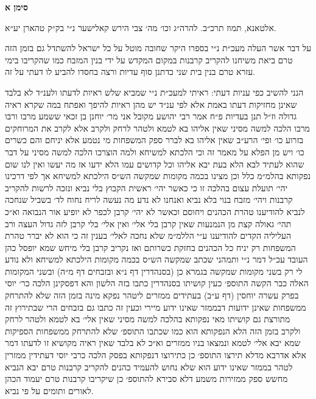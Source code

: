 \documentclass[12pt, openany]{book}
\newcommand{\chapname}{}
\newcommand{\newchap}[1]{
	\addcontentsline{toc}{chapter}{#1}
	\renewcommand{\chapname}{#1}
		\begin{center}
			\textbf{%
\fontsize{16pt}{16pt}\selectfont
				#1}
		\end{center}
}
\begin{document}
\newchap{סימן א}
\begin{multicols}{2}
אלטאנא, תמוז תרכ״ב. להרה״ג וכו׳ מה׳ צבי הירש קאלישער נ״י בק״ק טהארן יע״א.\\\vspace{0pt}

על דבר אשר העלה מעכ״ת נ״י בספרו היקר שחובה מוטל על כל ישראל להשתדל גם בזמן הזה טרם ביאת משיחנו להקריב קרבנות במקום המקדש על ידי בנין המזבח כמו שהקריבו בימי עזרא טרם בנין בית שני כדתנן סוף עדיות ורצה בחסדו להביע לו דעתי על זה.\\\vspace{0pt}

הנני להשיב כפי עניות דעתי: ראיתי למעכ״ת נ״י שמביא שלש ראיות לדעתו ולענ״ד לא בלבד שאינן מחזיקות דעתו באמת אלא לפי ענ״ד יש מהן ראיות להיפך ואפתח במה שקרא ראיה גדולה וז״ל תנן בעדיות פ״ח אמר רבי יהושע מקובל אני מר׳ יוחנן בן זכאי ששמע מרבו ורבו מרבו הלכה למשה מסיני שאין אליהו בא לטמא ולטהר לרחק ולקרב אלא לקרב את המרוחקים בזרוע כו׳ ופי׳ הרע״ב שאין אליהו בא לברר ספק המשפחות מי נטמע אלא יניחם והם כשרים כו׳ ויש מן הפלא על מאמר זה וכי הלכתא למשיחא ולמה הוצרכו הלכה למשה מסיני על דבר שהוא לעתיד לבא הלא בעת יבא אליהו וכל קדושים עמו הלא ידעו אז מה יעשו ואין לנו שום נפקותא בהלמ״מ כלל וכן מצינו בכמה מקומות שמקשה הש״ס הילכתא למשיחא אך לפי דרכינו יהי׳ תועלת עצום בהלכה זו כי כאשר יהי׳ ראשית הקבוץ בלי נביא ונזכה לרשות להקריב קרבנות ויהי׳ מזבח בנוי בלא נביא ואנחנו לא נדע מה נעשה לריח נחוח לד׳ בשביל שנחכה לנביא להודיענו טהרת הכהנים ויחוסם וכאשר לא יהי׳ קרבן לכפר לא יופיע אור הנבואה וא״כ תהי׳ גאולה קצת מן הנמנעות שאין קרבן בלי אלי׳ ואין אלי׳ בלי קרבן לזה גדול העצה ורב העליליה הקדים להודיענו ע״י הללמ״מ שלא נחכה לאלי׳ בענין זה כי הוא לא יברר טהרת המשפחות רק יניח כל הכהנים בחזקת כשרותם ואז נקריב קרבן בלי מיחש שמא יופסל כהן העובד עכ״ל דמר נ״י ותמהני שכתב שמקשה הש״ס בכמה מקומות הילכתא למשיחא ולא נודע לי רק בשני מקומות שמקשה בגמרא כן (בסנהדרין דף נ״א ובזבחים דף מ״ה) ובשני המקומות האלה כבר הקשה התוספ׳ כעין קושיתו בסנהדרין כתבו בזה הלשון והא דפסקינן הלכה כר׳ יוסי בפרק עשרה יוחסין (דף ע״ב) בעתידים ממזרים ליטהר נפקא מינה בזמן הזה שלא להתרחק ממשפחות שאינן ידועות דבממזר שאינו ידוע מיירי וכעין זה כתבו גם בזבחים הרי שבתירוץ זה מתורצת גם קושיתו מאי נפקותא בהלכה למשה מסיני שאין אלי׳ בא לטמא ולטהר לרחק ולקרב בזמן הזה הלא הנפקותא הוא כמו שכתבו התוספ׳ שלא להתרחק ממשפחות הספיקות שמא יבא אלי׳ לטמא ונמצאו בניו ממזרים וא״כ לא בלבד שאין ראיה מקושיא זו לדעתו דמר אלא אדרבא מדלא תירצו התוספ׳ כן כתירוצו דנפקותא בפסק הלכה כרבי יוסי דעתידין ממזרין לטהר בממזר שאינו ידוע הוא שלא נחוש להעמיד כהנים להקריב קרבנות טרם יבא הנביא מחשש ספק ממזירות משמע דלא סבירא להתוספ׳ כן שיקריבו קרבנות טרם יעמוד הכהן לאורים ותומים על פי נביא.\\\vspace{0pt}


\end{multicols}
\end{document}
